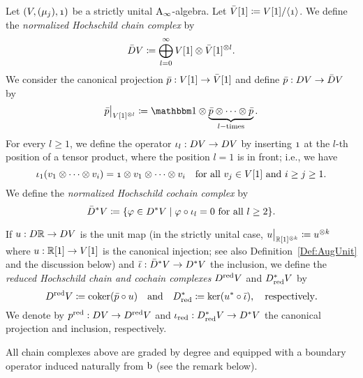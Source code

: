 \documentclass[\MainFolder/Text.tex]{subfiles}
\begin{document}
\begin{Definition}\label{Def:NormRedHoch}
Let $(V,(\mu_j),\NOne)$ be a strictly unital $\mathrm{A}_\infty$-algebra. Let $\bar{V}[1]\coloneqq V[1]/\langle\NOne\rangle$. We define the \emph{normalized Hochschild chain complex} by
\[ \bar{D} V \coloneqq \bigoplus_{l=0}^\infty V[1]\otimes\bar{V}[1]^{\otimes l}. \]
We consider the canonical projection $\bar{p}: V[1]\rightarrow \bar{V}[1]$ and define $\bar{p}: D V \rightarrow \bar{D} V$ by
\[ \Restr{\NormProj}{V[1]^{\otimes l}} \coloneqq \Id \otimes \underbrace{\NormProj \otimes \dotsb \otimes \NormProj}_{l-\text{times}}.\]
For every $l\ge 1$, we define the operator $\iota_l : D V \rightarrow D V$ by inserting $\NOne$ at the $l$-th position of a tensor product, where the position $l=1$ is in front; i.e., we have
\[ \InsOneOp_1(v_1\otimes\dotsb\otimes v_i) = \NOne\otimes v_1\otimes\dotsb\otimes v_i\quad\text{for all }v_j\in V[1]\text{ and }i\ge j\ge 1.\]
We define the \emph{normalized Hochschild cochain complex} by 
\[ \bar{D}^* V \coloneqq \{\varphi\in D^*V \mid \varphi \circ \iota_l = 0\text{ for all }l\ge 2\}. \]

If $u: D \mathbb{R} \rightarrow D V$ is the unit map (in the strictly unital case, $\Restr{u}{\R[1]^{\otimes k}}\coloneqq u^{\otimes k}$ where $u: \mathbb{R}[1]\to V[1]$ is the canonical injection; see also Definition~\ref{Def:AugUnit} and the discussion below) and $\bar{\iota}: \bar{D}^*V \rightarrow D^* V$ the inclusion, we define the \emph{reduced Hochschild chain and cochain complexes} $D^{\mathrm{red}} V$ and $D_{\mathrm{red}}^* V$ by
\[ D^{\mathrm{red}} V \coloneqq \operatorname{\mathrm{coker}}(\bar{p}\circ u)\quad\text{and}\quad D_{\mathrm{red}}^*
 \coloneqq \ker(u^* \circ \bar{\iota}),\quad\text{respectively}.\]
We denote by $p^{\mathrm{red}}: D V \rightarrow D^{\mathrm{red}} V$ and $\iota_{\mathrm{red}}: D^*_{\mathrm{red}} V \rightarrow D^* V$ the canonical projection and inclusion, respectively.

All chain complexes above are graded by degree and equipped with a boundary operator induced naturally from $\mathrm{b}$ (see the remark below).
\end{Definition}
\end{document}
